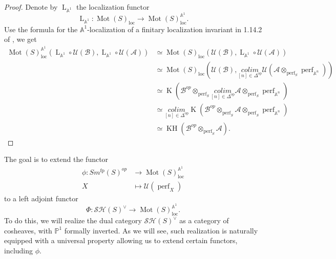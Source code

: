 \documentclass{article}
\theoremstyle{definition}
\newcommand{\on}{\operatorname}
\begin{document}
\begin{proof}
Denote by $\on{L}_{\mathbb{A}^1}$ the localization functor\[
\on{L}_{\mathbb{A}^1}: \on{Mot}(S)_{\on{loc}}\rightarrow\on{Mot}(S)_{\on{loc}}^{\mathbb{A}^1}.\]
Use the formula for the $\mathbb{A}^1$-localization of a finitary localization invariant in 1.14.2 of \cite{Sos}, we get\[
\begin{aligned}
\on{Mot}(S)_{\on{loc}}^{\mathbb{A}^1}(\on{L}_{\mathbb{A}^1}\circ\mathcal{U}(\mathcal{B}),\on{L}_{\mathbb{A}^1}\circ\mathcal{U}(\mathcal{A}))&\simeq\on{Mot}(S)_{\on{loc}}(\mathcal{U}(\mathcal{B}),\on{L}_{\mathbb{A}^1}\circ\mathcal{U}(\mathcal{A}))\\
&\simeq\on{Mot}(S)_{\on{loc}}(\mathcal{U}(\mathcal{B}),\underset{[n] \in \Delta^{\mathrm{op}}}{colim}\mathcal{U}(\mathcal{A} \otimes_{\on{perf}_S} \on{perf}_{\mathbb{A}^n}))\\
&\simeq\on{K}(\mathcal{B}^{op}\otimes_{\on{perf}_S}\underset{[n] \in \Delta^{\mathrm{op}}}{colim}\mathcal{A} \otimes_{\on{perf}_S} \on{perf}_{\mathbb{A}^n})\\
&\simeq\underset{[n] \in \Delta^{\mathrm{op}}}{colim}\on{K}(\mathcal{B}^{op}\otimes_{\on{perf}_S}\mathcal{A} \otimes_{\on{perf}_S} \on{perf}_{\mathbb{A}^n})\\
&\simeq\on{KH}(\mathcal{B}^{op}\otimes_{\on{perf}_S} \mathcal{A}).
\end{aligned}\]
\end{proof}
The goal is to extend the functor\[
\begin{aligned}
\phi: Sm^{\on{fp}}(S)^{op} & \rightarrow \on{Mot}(S)_{\on{loc}}^{\mathbb{A}^1}\\
X & \mapsto \mathcal{U}(\on{perf}_X)
\end{aligned}\]
to a left adjoint functor\[
\Phi: \mathcal{SH}(S)^{\vee}\rightarrow \on{Mot}(S)_{\on{loc}}^{\mathbb{A}^1}.\] 
To do this, we will realize the dual category $\mathcal{SH}(S)^{\vee}$ as a category of cosheaves, with $\mathbb{P}^1$ formally inverted. As we will see, such realization is naturally equipped with a universal property allowing us to extend certain functors, including $\phi$.
\end{document}

